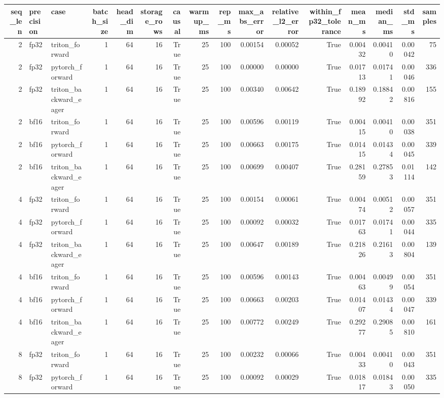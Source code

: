 \begin{tabular}{rllrrrrrrrrrrrrr}
\toprule
seq\_len & precision & case & batch\_size & head\_dim & storage\_rows & causal & warmup\_ms & rep\_ms & max\_abs\_error & relative\_l2\_error & within\_fp32\_tolerance & mean\_ms & median\_ms & std\_ms & samples \\
\midrule
2 & fp32 & triton\_forward & 1 & 64 & 16 & True & 25 & 100 & 0.00154 & 0.00052 & True & 0.00432 & 0.00410 & 0.00042 & 75 \\
2 & fp32 & pytorch\_forward & 1 & 64 & 16 & True & 25 & 100 & 0.00000 & 0.00000 & True & 0.01713 & 0.01741 & 0.00046 & 336 \\
2 & fp32 & triton\_backward\_eager & 1 & 64 & 16 & True & 25 & 100 & 0.00340 & 0.00642 & True & 0.18992 & 0.18842 & 0.00816 & 155 \\
2 & bf16 & triton\_forward & 1 & 64 & 16 & True & 25 & 100 & 0.00596 & 0.00119 & True & 0.00415 & 0.00410 & 0.00038 & 351 \\
2 & bf16 & pytorch\_forward & 1 & 64 & 16 & True & 25 & 100 & 0.00663 & 0.00175 & True & 0.01415 & 0.01434 & 0.00045 & 339 \\
2 & bf16 & triton\_backward\_eager & 1 & 64 & 16 & True & 25 & 100 & 0.00699 & 0.00407 & True & 0.28159 & 0.27853 & 0.01114 & 142 \\
4 & fp32 & triton\_forward & 1 & 64 & 16 & True & 25 & 100 & 0.00154 & 0.00061 & True & 0.00474 & 0.00512 & 0.00057 & 351 \\
4 & fp32 & pytorch\_forward & 1 & 64 & 16 & True & 25 & 100 & 0.00092 & 0.00032 & True & 0.01763 & 0.01741 & 0.00044 & 335 \\
4 & fp32 & triton\_backward\_eager & 1 & 64 & 16 & True & 25 & 100 & 0.00647 & 0.00189 & True & 0.21826 & 0.21613 & 0.00804 & 139 \\
4 & bf16 & triton\_forward & 1 & 64 & 16 & True & 25 & 100 & 0.00596 & 0.00143 & True & 0.00463 & 0.00499 & 0.00054 & 351 \\
4 & bf16 & pytorch\_forward & 1 & 64 & 16 & True & 25 & 100 & 0.00663 & 0.00203 & True & 0.01407 & 0.01434 & 0.00047 & 339 \\
4 & bf16 & triton\_backward\_eager & 1 & 64 & 16 & True & 25 & 100 & 0.00772 & 0.00249 & True & 0.29277 & 0.29085 & 0.00810 & 161 \\
8 & fp32 & triton\_forward & 1 & 64 & 16 & True & 25 & 100 & 0.00232 & 0.00066 & True & 0.00433 & 0.00410 & 0.00043 & 351 \\
8 & fp32 & pytorch\_forward & 1 & 64 & 16 & True & 25 & 100 & 0.00092 & 0.00029 & True & 0.01817 & 0.01843 & 0.00050 & 335 \\

\end{tabular}
